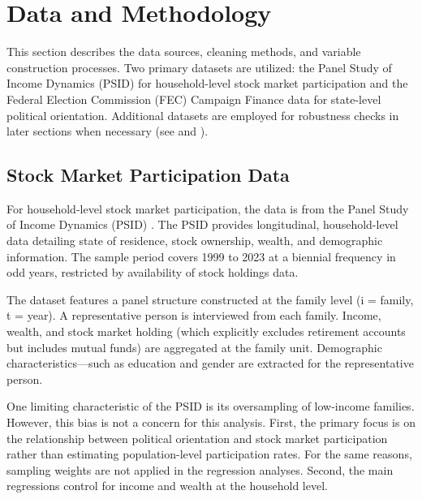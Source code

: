 
\section{Data and Methodology}
This section describes the data sources, cleaning methods, and variable construction processes. Two primary datasets are utilized: the Panel Study of Income Dynamics (PSID) for household-level stock market participation and the Federal Election Commission (FEC) Campaign Finance data for state-level political orientation. Additional datasets are employed for robustness checks in later sections when necessary (see  and ).

\subsection{Stock Market Participation Data}
\label{sec:data_psid}

For household-level stock market participation, the data is from the Panel Study of Income Dynamics (PSID) \citep{PSID2024}. The PSID provides longitudinal, household-level data detailing state of residence, stock ownership, wealth, and demographic information. The sample period covers 1999 to 2023 at a biennial frequency in odd years, restricted by availability of stock holdings data. 

The dataset features a panel structure constructed at the family level (i = family, t = year). A representative person is interviewed from each family. Income, wealth, and stock market holding (which explicitly excludes retirement accounts but includes mutual funds) are aggregated at the family unit. Demographic characteristics—such as education and gender are extracted for the representative person. 

One limiting characteristic of the PSID is its oversampling of low-income families. However, this bias is not a concern for this analysis. First, the primary focus is on the relationship between political orientation and stock market participation rather than estimating population-level participation rates. For the same reasons, sampling weights are not applied in the regression analyses. Second, the main regressions control for income and wealth at the household level.

